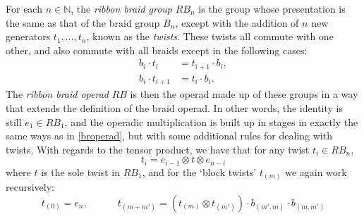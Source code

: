 \begin{Defi} For each $n \in \mathbb{N}$, the \emph{ribbon braid group} $RB_{n}$ is the group whose presentation is the same as that of the braid group $B_{n}$, except with the addition of $n$ new generators $t_1, \ldots, t_n$, known as the \emph{twists}. These twists all commute with one other, and also commute with all braids except in the following cases:
  \begin{align*}
    b_i \cdot t_i &= t_{i+1} \cdot b_i,\\
    b_i \cdot t_{i+1} &= t_i \cdot b_i.
  \end{align*}
The \emph{ribbon braid operad} $RB$ is then the operad made up of these groups in a way that extends the definition of the braid operad. In other words, the identity is still $e_1 \in RB_1$, and the operadic multiplication is built up in stages in exactly the same ways as in \cref{broperad}, but with some additional rules for dealing with twists. With regards to the tensor product, we have that for any twist $t_i \in RB_{n}$,
  \[
    t_i = e_{i-1} \otimes t \otimes e_{n-i}
  \]
where $t$ is the sole twist in $RB_1$, and for the `block twists' $t_{(m)}$ we again work recursively:
  \[
    t_{(0)} = e_n, \quad \quad \quad t_{(m+m')} = \left(t_{(m)} \otimes t_{(m')}\right) \cdot b_{(m', m)} \cdot b_{(m, m')}
  \]
\end{Defi}


